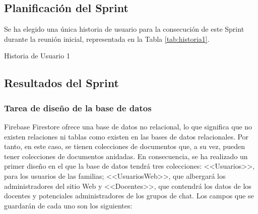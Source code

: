 \subsection{Planificación del Sprint}
Se ha elegido una única historia de usuario para la consecución de este Sprint durante la reunión inicial, representada en la Tabla \ref{tab:historia1}.

\begin{table}[hp]
	\centering
	{\small
		
	}
	\caption[Historia de Usuario 1]
	{Historia de Usuario 1}
	\label{tab:historia1}
\end{table}

\subsection{Resultados del Sprint}
\subsubsection{Tarea de diseño de la base de datos}
Firebase Firestore ofrece una base de datos no relacional, lo que significa que no existen relaciones ni tablas como existen en las bases de datos relacionales. Por tanto, en este caso, se tienen colecciones de documentos que, a su vez, pueden tener colecciones de documentos anidadas. En consecuencia, se ha realizado un primer diseño en el que la base de datos tendrá tres colecciones: <<Usuarios>>, para los usuarios de las familias; <<UsuariosWeb>>, que albergará los administradores del sitio Web y <<Docentes>>, que contendrá los datos de los docentes y potenciales administradores de los grupos de chat. Los campos que se guardarán de cada uno son los siguientes:

